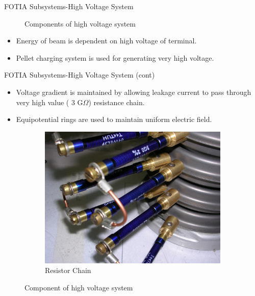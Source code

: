 \documentclass[11pt]{beamer}
\begin{document}
\begin{frame}{FOTIA Subsystems-High Voltage System}
\begin{figure}
        \caption{Components of high voltage system}\label{fig:high voltage system}
\end{figure}
  
  
  
  \begin{itemize}
      
    \item Energy of beam is dependent on high voltage of terminal.
    \item Pellet charging system is used for generating very high voltage. 
       
   \end{itemize}





\end{frame}



\begin{frame}{FOTIA Subsystems-High Voltage System (cont)}

   \begin{itemize}
    \item Voltage gradient is maintained by allowing leakage current to pass through very high value ( 3 G$ \Omega$) resistance chain.
    \item Equipotential rings are used to maintain uniform electric field.
    \end{itemize}

\begin{figure}
        \centering
        \begin{subfigure}[b]{0.5\textwidth}
                \includegraphics[width=\textwidth]{Resistor_chain.jpg}
                \caption{Resistor Chain}
                \label{fig:Resistor Chain}
        \end{subfigure}%
              
        \caption{Component of high voltage system}\label{fig:Component of High voltage system}
\end{figure}





\end{frame}
\end{document}
